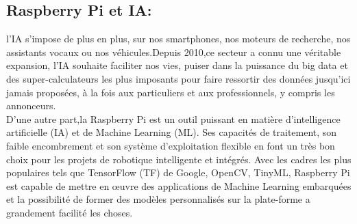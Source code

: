  \subsection{Raspberry Pi et IA:}
 l'IA s'impose de plus en plus, sur nos smartphones, nos moteurs de recherche, nos assistants vocaux ou nos véhicules.Depuis 2010,ce secteur a connu une véritable expansion, l'IA souhaite faciliter nos vies, puiser dans la puissance du big data et des super-calculateurs les plus imposants pour faire ressortir des données jusqu'ici jamais proposées, à la fois aux particuliers et aux professionnels, y compris les annonceurs.\\
 \vspace{9pt}
 \newline
  D'une autre part,la Raspberry Pi est un outil puissant en matière d'intelligence artificielle (IA) et de Machine Learning (ML). Ses capacités de traitement, son faible encombrement et son système d'exploitation flexible en font un très bon choix pour les projets de robotique intelligente et intégrés. Avec les cadres les plus populaires tels que TensorFlow (TF) de Google, OpenCV, TinyML, Raspberry Pi est capable de mettre en œuvre des applications de Machine Learning embarquées et la possibilité de former des modèles personnalisés sur la plate-forme a grandement facilité les choses.\\
